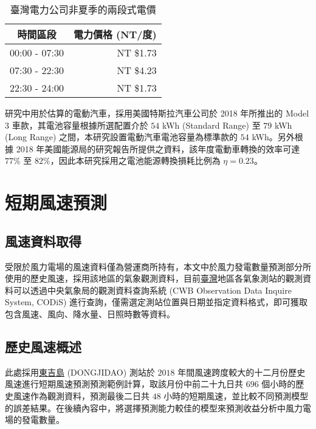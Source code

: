 \begin{table}[htbp]
  \centering
  \caption[臺灣電力公司非夏季兩段式電價]{臺灣電力公司非夏季的兩段式電價 \cite{taipower2018price}}
  \begin{tabular}{cr}
    \toprule
    \textbf{時間區段} & \textbf{電力價格 (NT/度) } \\
    \midrule
    00:00 - 07:30 & NT \$1.73 \\
    07:30 - 22:30 & NT \$4.23 \\
    22:30 - 24:00 & NT \$1.73 \\
    \bottomrule
  \end{tabular}
  \label{table: Electric Price}
\end{table}

研究中用於估算的電動汽車，採用美國特斯拉汽車公司於 2018 年所推出的 Model 3 車款，其電池容量根據所選配置介於 $54$ \si{\kWh}  (Standard Range) 至 $79$ \si{\kWh}  (Long Range) 之間，本研究設置電動汽車電池容量為標準款的 $54$ \si{\kWh}。另外根據 2018 年美國能源局的研究報告所提供之資料，該年度電動車轉換的效率可達 $77\%$ 至 $82\%$，因此本研究採用之電池能源轉換損耗比例為 $\eta = 0.23$。

\section{短期風速預測}

\subsection{風速資料取得}

受限於風力電場的風速資料僅為營運商所持有，本文中於風力發電數量預測部分所使用的歷史風速，採用該地區的氣象觀測資料，目前\uline{臺灣}地區各氣象測站的觀測資料可以透過中央氣象局的觀測資料查詢系統 (CWB Observation Data Inquire System, CODiS) 進行查詢，僅需選定測站位置與日期並指定資料格式，即可獲取包含風速、風向、降水量、日照時數等資料。

\subsection{歷史風速概述}

此處採用\uline{東吉島} (DONGJIDAO) 測站於 $2018$ 年間風速跨度較大的十二月份歷史風速進行短期風速預測預測範例計算，取該月份中前二十九日共 $696$ 個小時的歷史風速作為觀測資料，預測最後二日共 $48$ 小時的短期風速，並比較不同預測模型的誤差結果。在後續內容中，將選擇預測能力較佳的模型來預測收益分析中風力電場的發電數量。

